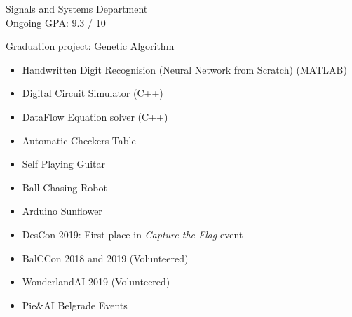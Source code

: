 


Signals and Systems Department\\
Ongoing GPA: 9.3 / 10

Graduation project: Genetic Algorithm








    \begin{itemize}
        \item Handwritten Digit Recognision (Neural Network from Scratch) (MATLAB)
        \item Digital Circuit Simulator (C++)
        \item DataFlow Equation solver (C++)
    \end{itemize}

    \begin{itemize}
        \item Automatic Checkers Table
        \item Self Playing Guitar
        \item Ball Chasing Robot
        \item Arduino Sunflower
    \end{itemize}
    
    
    \begin{itemize}
        \item DesCon 2019: First place in \textit{Capture the Flag} event
        \item BalCCon 2018 and 2019 (Volunteered)
        \item WonderlandAI 2019 (Volunteered)
        \item Pie\&AI Belgrade Events
    \end{itemize}
    
